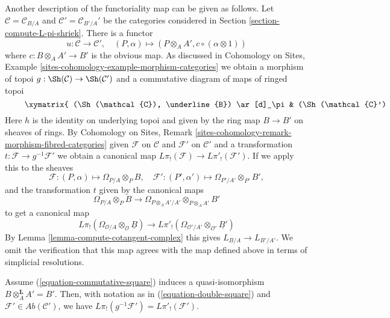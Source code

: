 \medskip\noindent
Another description of the functoriality map can be given as follows.
Let $\mathcal{C} = \mathcal{C}_{B/A}$ and $\mathcal{C}' = \mathcal{C}_{B'/A}'$
be the categories considered in Section \ref{section-compute-L-pi-shriek}.
There is a functor
$$
u : \mathcal{C} \longrightarrow \mathcal{C}',\quad
(P, \alpha) \longmapsto (P \otimes_A A', c \circ (\alpha \otimes 1))
$$
where $c : B \otimes_A A' \to B'$ is the obvious map. As discussed in
Cohomology on Sites, Example
\ref{sites-cohomology-example-morphism-categories}
we obtain a morphism of topoi $g : \Sh(\mathcal{C}) \to \Sh(\mathcal{C}')$
and a commutative diagram of maps of ringed topoi
\begin{equation}
\label{equation-double-square}
\vcenter{
\xymatrix{
(\Sh(\mathcal{C}), \underline{B}) \ar[d]_\pi &
(\Sh(\mathcal{C}'), \underline{B'}) \ar[d]_\pi \ar[l]^h \ar[r]_g &
(\Sh(\mathcal{C}), \underline{B'}) \ar[d]_{\pi'} \\
(\Sh(*), B) &
(\Sh(*), B') \ar[l]_f \ar[r] &
(\Sh(*), B')
}
}
\end{equation}
Here $h$ is the identity on underlying topoi and given by the ring map
$B \to B'$ on sheaves of rings. 
By Cohomology on Sites, Remark
\ref{sites-cohomology-remark-morphism-fibred-categories}
given $\mathcal{F}$ on $\mathcal{C}$ and $\mathcal{F}'$ on $\mathcal{C}'$
and a transformation $t : \mathcal{F} \to g^{-1}\mathcal{F}'$
we obtain a canonical map $L\pi_!(\mathcal{F}) \to L\pi'_!(\mathcal{F}')$.
If we apply this to the sheaves
$$
\mathcal{F} : (P, \alpha) \mapsto \Omega_{P/A} \otimes_P B,\quad
\mathcal{F}' : (P', \alpha') \mapsto \Omega_{P'/A'} \otimes_{P'} B',
$$
and the transformation $t$ given by the canonical maps
$$
\Omega_{P/A} \otimes_P B \longrightarrow
\Omega_{P \otimes_A A'/A'} \otimes_{P \otimes_A A'} B'
$$
to get a canonical map
$$
L\pi_!(\Omega_{\mathcal{O}/A} \otimes_\mathcal{O} \underline{B})
\longrightarrow
L\pi'_!(\Omega_{\mathcal{O}'/A'} \otimes_{\mathcal{O}'} \underline{B'})
$$
By Lemma \ref{lemma-compute-cotangent-complex} this gives
$L_{B/A} \to L_{B'/A'}$. We omit the verification that this map
agrees with the map defined above in terms of simplicial
resolutions.

\begin{lemma}
\label{lemma-flat-base-change}
Assume (\ref{equation-commutative-square}) induces a quasi-isomorphism
$B \otimes_A^\mathbf{L} A' = B'$. Then, with notation as in
(\ref{equation-double-square}) and
$\mathcal{F}' \in \textit{Ab}(\mathcal{C}')$,
we have $L\pi_!(g^{-1}\mathcal{F}') = L\pi'_!(\mathcal{F}')$.
\end{lemma}

